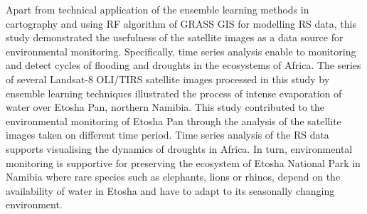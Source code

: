 \documentclass[draft]{agujournal2019}
\begin{document}
Apart from technical application of the ensemble learning methods in cartography and using RF algorithm of GRASS GIS for modelling RS data, this study demonstrated the usefulness of the satellite images as a data source for environmental monitoring. Specifically, time series analysis enable to monitoring and detect cycles of flooding and droughts in the ecosystems of Africa. The series of several Landsat-8 OLI/TIRS satellite images processed in this study by ensemble learning techniques illustrated the process of intense evaporation of water over Etosha Pan, northern Namibia. This study contributed to the environmental monitoring of Etosha Pan through the analysis of the satellite images taken on different time period. Time series analysis of the RS data supports visualising the dynamics of droughts in Africa. In turn, environmental monitoring is supportive for preserving the ecosystem of Etosha National Park in Namibia where rare species such as elephants, lions or rhinos, depend on the availability of water in Etosha and have to adapt to its seasonally changing environment. 
%
%

%  
 


%
%
%
%
\end{document}
